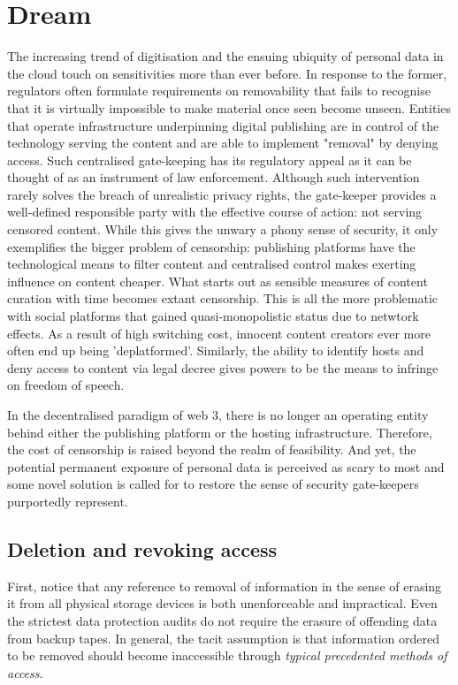 


\section{Dream}

The increasing trend of digitisation and the ensuing ubiquity of personal data in the cloud touch on sensitivities more than ever before. 
In response to the former, regulators often formulate requirements on removability that fails to recognise 
that it is virtually impossible to make material once seen become unseen.
Entities that operate infrastructure underpinning digital publishing are in control of the technology serving the content and  are able to implement "removal" by denying access.
Such centralised gate-keeping  has its regulatory appeal as it can be thought of as an instrument of law enforcement. Although such intervention rarely solves the breach of unrealistic privacy rights, the gate-keeper provides a well-defined responsible party with the effective course of action: not serving censored content.
While this gives the unwary a phony sense of security, it only exemplifies the bigger problem of censorship: publishing platforms have the technological means to filter content and centralised control makes exerting influence on content cheaper.  What starts out as sensible measures of content curation with time becomes extant censorship. This is all the more problematic with social platforms that gained quasi-monopolistic status due to netwtork effects. As a result of high switching cost, innocent content creators ever more often end up being 'deplatformed'. Similarly, the ability to identify hosts and deny access to content via legal decree gives powers to be the means to infringe on freedom of speech. 

In the decentralised paradigm of web 3, there is no longer an operating entity behind either the publishing platform or the hosting infrastructure. Therefore, the cost of censorship is raised beyond the realm of feasibility. And yet, the potential permanent exposure of personal data is perceived as scary to most and some novel solution is called for to restore the sense of security gate-keepers purportedly represent. 

\subsection{Deletion and revoking access}

First, notice that any reference to removal of information in the sense of erasing it from all physical storage devices is both unenforceable and impractical. Even the strictest data protection audits do not require the erasure of offending data from backup tapes. In general, the tacit assumption is that information ordered to be removed should become inaccessible through \emph{typical precedented methods of access}.

